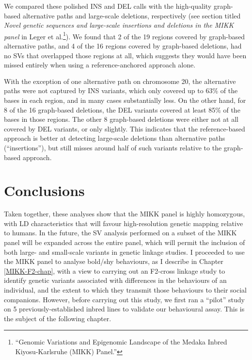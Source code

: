 \documentclass[
]{book}
\begin{document}
We compared these polished INS and DEL calls with the high-quality graph-based alternative paths and large-scale deletions, respectively (see section titled \emph{Novel genetic sequences and large-scale insertions and deletions in the MIKK panel} in Leger et al.\footnote{{``Genomic Variations and Epigenomic Landscape of the {Medaka Inbred Kiyosu-Karlsruhe} ({MIKK}) Panel.''}}). We found that 2 of the 19 regions covered by graph-based alternative paths, and 4 of the 16 regions covered by graph-based deletions, had no SVs that overlapped those regions at all, which suggests they would have been missed entirely when using a reference-anchored approach alone.

With the exception of one alternative path on chromosome 20, the alternative paths were not captured by INS variants, which only covered up to 63\% of the bases in each region, and in many cases substantially less. On the other hand, for 8 of the 16 graph-based deletions, the DEL variants covered at least 85\% of the bases in those regions. The other 8 graph-based deletions were either not at all covered by DEL variants, or only slightly. This indicates that the reference-based approach is better at detecting large-scale deletions than alternative paths (``insertions''), but still misses around half of such variants relative to the graph-based approach.

\hypertarget{conclusions}{%
\section{Conclusions}\label{conclusions}}

Taken together, these analyses show that the MIKK panel is highly homozygous, with LD characteristics that will favour high-resolution genetic mapping relative to humans. In the future, the SV analysis performed on a subset of the MIKK panel will be expanded across the entire panel, which will permit the inclusion of both large- and small-scale variants in genetic linkage studies. I proceeded to use the MIKK panel to analyse bold/shy behaviours, as I describe in Chapter \ref{MIKK-F2-chap}, with a view to carrying out an F2-cross linkage study to identify genetic variants associated with differences in the behaviours of an individual, and the extent to which they transmit those behaviours to their social companions. However, before carrying out this study, we first ran a ``pilot'' study on 5 previously-established inbred lines to validate our behavioural assay. This is the subject of the following chapter.
\end{document}

